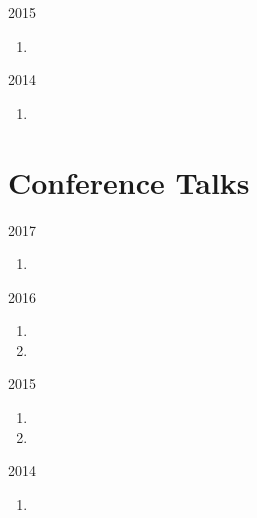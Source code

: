 \begin{paracol}{2}
  \textsc{2015}
\switchcolumn
  \begin{enumerate}
    \setcounter{enumi}{\thepubcounter}
    \item {}
    \setcounter{pubcounter}{\theenumi}
  \end{enumerate}
\end{paracol}

\begin{paracol}{2}
  \textsc{2014}
\switchcolumn
  \begin{enumerate}
    \setcounter{enumi}{\thepubcounter}
    \item {}
    \setcounter{pubcounter}{\theenumi}
  \end{enumerate}
\end{paracol}

\section*{Conference Talks}

\begin{paracol}{2}
  \textsc{2017}
\switchcolumn
  \begin{enumerate}
    \setcounter{enumi}{\thepubcounter}
    \item {}
    \setcounter{pubcounter}{\theenumi}
  \end{enumerate}
\end{paracol}

\begin{paracol}{2}
  \textsc{2016}
\switchcolumn
  \begin{enumerate}
    \setcounter{enumi}{\thepubcounter}
    \item {}
    \item {}
    \setcounter{pubcounter}{\theenumi}
  \end{enumerate}
\end{paracol}

\begin{paracol}{2}
  \textsc{2015}
\switchcolumn
  \begin{enumerate}
    \setcounter{enumi}{\thepubcounter}
    \item {}
    \item {}
    \setcounter{pubcounter}{\theenumi}
  \end{enumerate}
\end{paracol}

\begin{paracol}{2}
  \textsc{2014}
\switchcolumn
  \begin{enumerate}
    \setcounter{enumi}{\thepubcounter}
    \item {}
    \setcounter{pubcounter}{\theenumi}
  \end{enumerate}
\end{paracol}